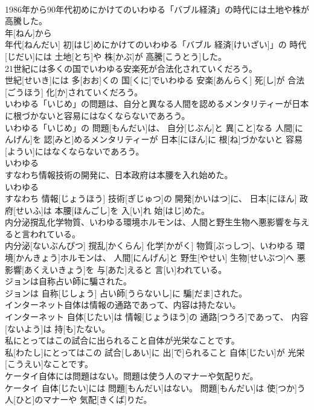 \documentclass[8pt]{extreport}
\begin{document}
\begin{CJK}{UTF8}{min}
\\	1986年から90年代初めにかけてのいわゆる「バブル経済」の時代には土地や株が高騰した。	
\\	年[ねん]から 
\\	年代[ねんだい] 初[はじ]めにかけてのいわゆる「バブル 経済[けいざい]」の 時代[じだい]には 土地[とち]や 株[かぶ]が 高騰[こうとう]した。
\\	21世紀には多くの国でいわゆる安楽死が合法化されていくだろう。	
\\	世紀[せいき]には 多[おお]くの 国[くに]でいわゆる 安楽[あんらく] 死[し]が 合法[ごうほう] 化[か]されていくだろう。
\\	いわゆる「いじめ」の問題は、自分と異なる人間を認めるメンタリティーが日本に根づかないと容易にはなくならないであろう。	
\\	いわゆる「いじめ」の 問題[もんだい]は、 自分[じぶん]と 異[こと]なる 人間[にんげん]を 認[みと]めるメンタリティーが 日本[にほん]に 根[ね]づかないと 容易[ようい]にはなくならないであろう。
\\	いわゆる
\\	すなわち情報技術の開発に、日本政府は本腰を入れ始めた。	
\\	いわゆる 
\\	すなわち 情報[じょうほう] 技術[ぎじゅつ]の 開発[かいはつ]に、 日本[にほん] 政府[せいふ]は 本腰[ほんごし]を 入[い]れ 始[はじ]めた。
\\	内分泌撹乱化学物質、いわゆる環境ホルモンは、人間と野生生物へ悪影響を与えると言われている。	
\\	内分泌[ないぶんぴつ] 撹乱[かくらん] 化学[かがく] 物質[ぶっしつ]、いわゆる 環境[かんきょう]ホルモンは、 人間[にんげん]と 野生[やせい] 生物[せいぶつ]へ 悪影響[あくえいきょう]を 与[あた]えると 言[い]われている。
\\	ジョンは自称占い師に騙された。	
\\	ジョンは 自称[じしょう] 占い師[うらないし]に 騙[だま]された。
\\	インターネット自体は情報の通路であって、内容は持たない。	
\\	インターネット 自体[じたい]は 情報[じょうほう]の 通路[つうろ]であって、 内容[ないよう]は 持[も]たない。
\\	私にとってはこの試合に出られること自体が光栄なことです。	
\\	私[わたし]にとってはこの 試合[しあい]に 出[で]られること 自体[じたい]が 光栄[こうえい]なことです。
\\	ケータイ自体には問題はない。問題は使う人のマナーや気配りだ。	
\\	ケータイ 自体[じたい]には 問題[もんだい]はない。 問題[もんだい]は 使[つか]う 人[ひと]のマナーや 気配[きくば]りだ。

\end{CJK}
\end{document}
